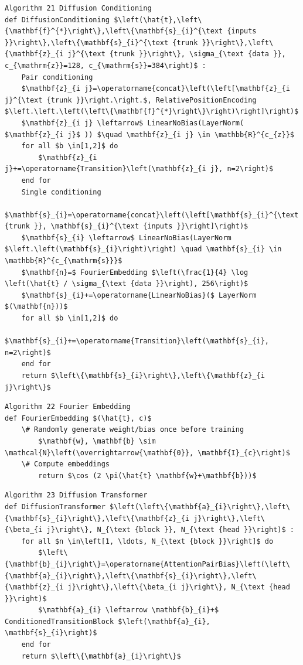 \documentclass[10pt]{article}
\begin{document}
\begin{verbatim}
Algorithm 21 Diffusion Conditioning
def DiffusionConditioning $\left(\hat{t},\left\{\mathbf{f}^{*}\right\},\left\{\mathbf{s}_{i}^{\text {inputs }}\right\},\left\{\mathbf{s}_{i}^{\text {trunk }}\right\},\left\{\mathbf{z}_{i j}^{\text {trunk }}\right\}, \sigma_{\text {data }}, c_{\mathrm{z}}=128, c_{\mathrm{s}}=384\right)$ :
    Pair conditioning
    $\mathbf{z}_{i j}=\operatorname{concat}\left(\left[\mathbf{z}_{i j}^{\text {trunk }}\right.\right.$, RelativePositionEncoding $\left.\left.\left(\left\{\mathbf{f}^{*}\right\}\right)\right]\right)$
    $\mathbf{z}_{i j} \leftarrow$ LinearNoBias(LayerNorm( $\mathbf{z}_{i j}$ )) $\quad \mathbf{z}_{i j} \in \mathbb{R}^{c_{z}}$
    for all $b \in[1,2]$ do
        $\mathbf{z}_{i j}+=\operatorname{Transition}\left(\mathbf{z}_{i j}, n=2\right)$
    end for
    Single conditioning
    $\mathbf{s}_{i}=\operatorname{concat}\left(\left[\mathbf{s}_{i}^{\text {trunk }}, \mathbf{s}_{i}^{\text {inputs }}\right]\right)$
    $\mathbf{s}_{i} \leftarrow$ LinearNoBias(LayerNorm $\left.\left(\mathbf{s}_{i}\right)\right) \quad \mathbf{s}_{i} \in \mathbb{R}^{c_{\mathrm{s}}}$
    $\mathbf{n}=$ FourierEmbedding $\left(\frac{1}{4} \log \left(\hat{t} / \sigma_{\text {data }}\right), 256\right)$
    $\mathbf{s}_{i}+=\operatorname{LinearNoBias}($ LayerNorm $(\mathbf{n}))$
    for all $b \in[1,2]$ do
        $\mathbf{s}_{i}+=\operatorname{Transition}\left(\mathbf{s}_{i}, n=2\right)$
    end for
    return $\left\{\mathbf{s}_{i}\right\},\left\{\mathbf{z}_{i j}\right\}$
\end{verbatim}

\begin{verbatim}
Algorithm 22 Fourier Embedding
def FourierEmbedding $(\hat{t}, c)$
    \# Randomly generate weight/bias once before training
        $\mathbf{w}, \mathbf{b} \sim \mathcal{N}\left(\overrightarrow{\mathbf{0}}, \mathbf{I}_{c}\right)$
    \# Compute embeddings
        return $\cos (2 \pi(\hat{t} \mathbf{w}+\mathbf{b}))$
\end{verbatim}

\begin{verbatim}
Algorithm 23 Diffusion Transformer
def DiffusionTransformer $\left(\left\{\mathbf{a}_{i}\right\},\left\{\mathbf{s}_{i}\right\},\left\{\mathbf{z}_{i j}\right\},\left\{\beta_{i j}\right\}, N_{\text {block }}, N_{\text {head }}\right)$ :
    for all $n \in\left[1, \ldots, N_{\text {block }}\right]$ do
        $\left\{\mathbf{b}_{i}\right\}=\operatorname{AttentionPairBias}\left(\left\{\mathbf{a}_{i}\right\},\left\{\mathbf{s}_{i}\right\},\left\{\mathbf{z}_{i j}\right\},\left\{\beta_{i j}\right\}, N_{\text {head }}\right)$
        $\mathbf{a}_{i} \leftarrow \mathbf{b}_{i}+$ ConditionedTransitionBlock $\left(\mathbf{a}_{i}, \mathbf{s}_{i}\right)$
    end for
    return $\left\{\mathbf{a}_{i}\right\}$
\end{verbatim}
\end{document}
